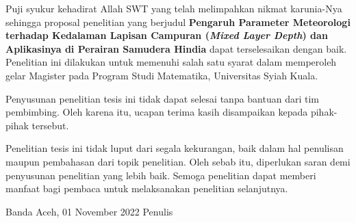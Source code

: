 \begin{spacing}{1.5}
	\pagestyle{empty}
	
	\vskip 1cm
	\par Puji syukur kehadirat Allah SWT yang telah melimpahkan nikmat karunia-Nya sehingga proposal penelitian yang berjudul \textbf{Pengaruh Parameter Meteorologi terhadap Kedalaman Lapisan Campuran (\textit{Mixed Layer Depth}) dan Aplikasinya di Perairan Samudera Hindia} dapat terselesaikan dengan baik. Penelitian ini dilakukan untuk memenuhi salah satu syarat dalam memperoleh gelar Magister pada Program Studi Matematika, Universitas Syiah Kuala.
	\par Penyusunan penelitian tesis ini tidak dapat selesai tanpa bantuan dari tim pembimbing. Oleh karena itu, ucapan terima  kasih disampaikan kepada pihak-pihak tersebut.
	\par Penelitian tesis ini tidak luput dari segala kekurangan, baik dalam hal penulisan maupun pembahasan dari topik penelitian. Oleh sebab itu, diperlukan saran demi penyusunan penelitian yang lebih baik. Semoga penelitian dapat memberi manfaat bagi pembaca untuk melaksanakan penelitian selanjutnya.
	\vskip 1cm  
	\begin{flushright}
		Banda Aceh, 01 November 2022
		\vskip 2cm
		Penulis	
	\end{flushright}
\end{spacing}
\pagestyle{empty}